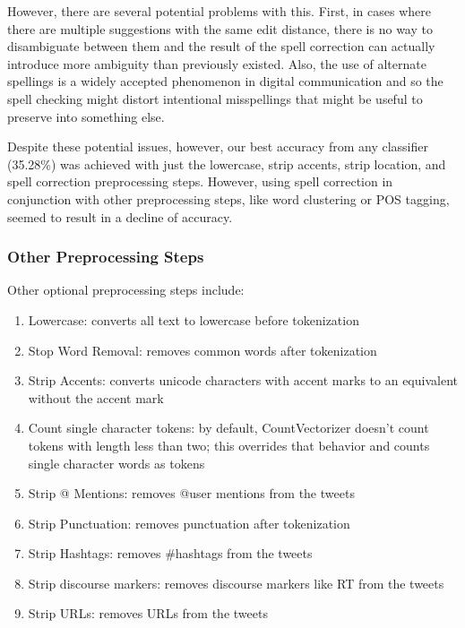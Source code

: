 \documentclass[10pt]{article}
\begin{document}
However, there are several potential problems with this. First, in cases where there are multiple suggestions with the same edit distance, there is no way to disambiguate between them and the result of the spell correction can actually introduce more ambiguity than previously existed. Also, the use of alternate spellings is a widely accepted phenomenon in digital communication and so the spell checking might distort intentional misspellings that might be useful to preserve into something else.

Despite these potential issues, however, our best accuracy from any classifier (35.28\%) was achieved with just the lowercase, strip accents, strip location, and spell correction preprocessing steps. However, using spell correction in conjunction with other preprocessing steps, like word clustering or POS tagging, seemed to result in a decline of accuracy.

\subsubsection{Other Preprocessing Steps}
Other optional preprocessing steps include:
\begin{enumerate}
\item Lowercase: converts all text to lowercase before tokenization
\item Stop Word Removal: removes common words after tokenization
\item Strip Accents: converts unicode characters with accent marks to an equivalent without the accent mark
\item Count single character tokens: by default, CountVectorizer doesn't count tokens with length less than two; this overrides that behavior and counts single character words as tokens
\item Strip @ Mentions: removes @user mentions from the tweets
\item Strip Punctuation: removes punctuation after tokenization
\item Strip Hashtags: removes \#hashtags from the tweets
\item Strip discourse markers: removes discourse markers like RT from the tweets
\item Strip URLs: removes URLs from the tweets
\end{enumerate}

\end{document}
